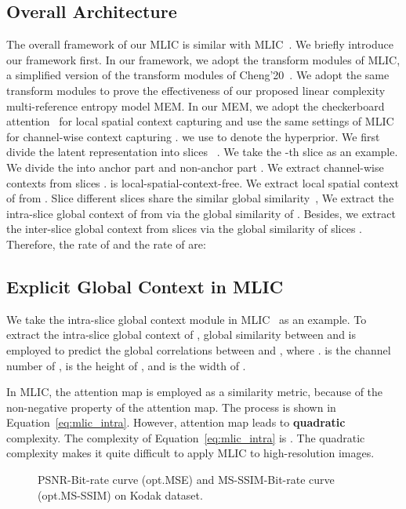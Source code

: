 \documentclass{article}
\theoremstyle{plain}
\theoremstyle{definition}
\theoremstyle{remark}
\begin{document}
  \subsection{Overall Architecture}
  \label{sec:method:overview}
  The overall framework of our MLIC is similar with
  MLIC~\cite{jiang2022mlic}. We briefly introduce our framework first.
  In our framework, we adopt the transform modules of MLIC,
  a simplified version of the transform modules of Cheng'20~\cite{cheng2020learned}.
  We adopt the same transform modules to prove the effectiveness of 
  our proposed linear complexity multi-reference entropy model MEM.
  In our MEM, we adopt the checkerboard attention~\cite{jiang2022mlic} for local spatial
  context capturing and use the same settings of MLIC~\cite{jiang2022mlic} 
  for channel-wise context capturing .
  we use  to denote the hyperprior. 
  We first divide the latent representation 
  into slices ~\cite{minnen2020channel}.
  We take the -th slice as an example. We divide the 
  into anchor part  and non-anchor part
  . We extract channel-wise contexts
   from slices .
   is local-spatial-context-free.
  We extract local spatial context  of 
  from . Slice different slices 
  share the similar global similarity~\cite{jiang2022mlic,guo2021causal},
We extract the intra-slice global context 
  of  from 
  via the global similarity of .
  Besides, we extract the inter-slice global context 
  from slices  via the
  global similarity of slices .
  Therefore, the rate of  and 
  the rate of  are:
  \begin{small}
  
  \end{small}
  \subsection{Explicit Global Context in MLIC}
  \label{sec:method:ggc_mlicp}
  We take the intra-slice global context module in MLIC~\cite{jiang2022mlic} as an example.
  To extract the intra-slice global context of ,
  global similarity between 
  and  is employed to predict the global correlations
  between  and ,
  where .
   is the channel number of ,  is 
  the height of , and  is the width of .
  
  In MLIC\cite{jiang2022mlic}, the attention map is employed 
  as a similarity metric, because of the non-negative property of the attention map.
  The process is shown in Equation~\ref{eq:mlic_intra}.
  However, attention map leads to \textbf{quadratic} complexity.
  The complexity of Equation~\ref{eq:mlic_intra} is .
  The quadratic complexity makes it quite difficult to apply MLIC to high-resolution images.
  \begin{figure*}
    \centering
    \caption{PSNR-Bit-rate curve (opt.MSE) and MS-SSIM-Bit-rate curve (opt.MS-SSIM) on Kodak dataset.}
    \label{fig:rd}
  \end{figure*}
\end{document}
